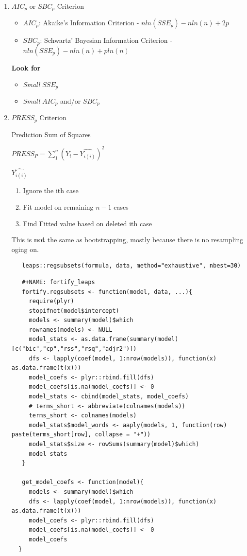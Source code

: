 \documentclass[11pt]{article}
\begin{document}
\begin{enumerate}
\item \(AIC_p\) or \(SBC_p\) Criterion
\begin{itemize}
\item \(AIC_p\): Akaike's Information Criterion - \(n ln(SSE_p) - n ln(n) + 2p\)
\item \(SBC_p\): Schwartz' Bayesian Information Criterion - \(n ln(SSE_p) - n
     ln(n) + p ln(n)\)
\end{itemize}

\textbf{Look for}
\begin{itemize}
\item \emph{Small} \(SSE_p\)
\item \emph{Small} \(AIC_p\) and/or \(SBC_p\)
\end{itemize}

\item \(PRESS_p\) Criterion

Prediction Sum of Squares

\(PRESS_P = \sum_{1}^{n} (Y_i - \hat{Y_{i (i)}})^2\)

\textbf{\(\hat{Y_{i(i)}}\)}
\begin{enumerate}
\item Ignore the ith case
\item Fit model on remaining \(n - 1\) cases
\item Find Fitted value based on deleted ith case
\end{enumerate}

This is \textbf{not} the same as bootstrapping, mostly because there is no
resampling oging on.

\begin{verbatim}
   leaps::regsubsets(formula, data, method="exhaustive", nbest=30)
\end{verbatim}

\begin{verbatim}
   #+NAME: fortify_leaps
   fortify.regsubsets <- function(model, data, ...){
     require(plyr)
     stopifnot(model$intercept)
     models <- summary(model)$which
     rownames(models) <- NULL
     model_stats <- as.data.frame(summary(model)[c("bic","cp","rss","rsq","adjr2")])
     dfs <- lapply(coef(model, 1:nrow(models)), function(x) as.data.frame(t(x)))
     model_coefs <- plyr::rbind.fill(dfs)
     model_coefs[is.na(model_coefs)] <- 0
     model_stats <- cbind(model_stats, model_coefs)
     # terms_short <- abbreviate(colnames(models))
     terms_short <- colnames(models)
     model_stats$model_words <- aaply(models, 1, function(row) paste(terms_short[row], collapse = "+"))
     model_stats$size <- rowSums(summary(model)$which)
     model_stats
   }

   get_model_coefs <- function(model){
     models <- summary(model)$which
     dfs <- lapply(coef(model, 1:nrow(models)), function(x) as.data.frame(t(x)))
     model_coefs <- plyr::rbind.fill(dfs)
     model_coefs[is.na(model_coefs)] <- 0
     model_coefs
  }
\end{verbatim}
\end{enumerate}
\end{document}
